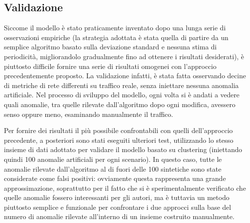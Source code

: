 \documentclass[12pt,a4paper,cucitura]{toptesi}
\begin{document}
\subsection{Validazione}

Siccome il modello è stato praticamente inventato dopo una lunga serie di osservazioni empiriche (la strategia adottata è stata quella di partire da un semplice algoritmo basato sulla deviazione standard e nessuna stima di periodicità, migliorandolo gradualmente fino ad ottenere i risultati desiderati), è piuttosto difficile fornire una serie di risultati omogenei con l'approccio precedentemente proposto.
La validazione infatti, è stata fatta osservando decine di metriche di rete differenti su traffico reale, senza iniettare nessuna anomalia artificiale.
Nel processo di sviluppo del modello, ogni volta si è andati a vedere quali anomalie, tra quelle rilevate dall'algoritmo dopo ogni modifica, avessero senso oppure meno, esaminando manualmente il traffico.

Per fornire dei risultati il più possibile confrontabili con quelli dell'approccio precedente, a posteriori sono stati eseguiti ulteriori test, utilizzando lo stesso insieme di dati adottato per validare il modello basato su clustering (iniettando quindi 100 anomalie artificiali per ogni scenario).
In questo caso, tutte le anomalie rilevate dall'algoritmo al di fuori delle 100 sintetiche sono state considerate come falsi positivi: ovviamente questa rappresenta una grande approssimazione, soprattutto per il fatto che si è sperimentalmente verificato che quelle anomalie fossero interessanti per gli autori, ma è tuttavia un metodo piuttosto semplice e funzionale per confrontare i due approcci sulla base del numero di anomalie rilevate all'interno di un insieme costruito manualmente.

\end{document}
